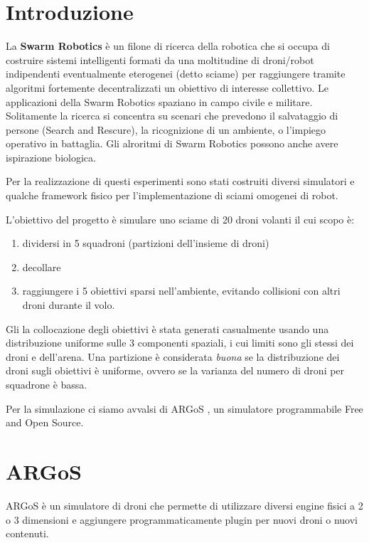 \documentclass[a4paper,11pt,oneside, table]{article}
\begin{document}
    \printindex
    \tableofcontents
    \renewcommand{\baselinestretch}{1.5}

\section{Introduzione}

La \textbf{Swarm Robotics} \`e un filone di ricerca della robotica che si occupa di costruire sistemi intelligenti formati da una moltitudine di droni/robot indipendenti eventualmente eterogenei (detto sciame) per raggiungere tramite algoritmi fortemente decentralizzati un obiettivo di interesse collettivo.
Le applicazioni della Swarm Robotics spaziano in campo civile e militare.
Solitamente la ricerca si concentra su scenari che prevedono il salvataggio di persone (Search and Rescure), la ricognizione di un ambiente, o l'impiego operativo in battaglia.
Gli alroritmi di Swarm Robotics possono anche avere ispirazione biologica\cite{mclurkin2005dynamic}.

Per la realizzazione di questi esperimenti sono stati costruiti diversi simulatori e qualche framework fisico per l'implementazione di sciami omogenei di robot.

L'obiettivo del progetto \`e simulare uno sciame di 20 droni volanti il cui scopo \`e:
\begin{enumerate}
  \item dividersi in 5 squadroni (partizioni dell'insieme di droni)
  \item decollare
  \item raggiungere i 5 obiettivi sparsi nell'ambiente, evitando collisioni con altri droni durante il volo.
\end{enumerate}

Gli la collocazione degli obiettivi è stata generati casualmente usando una distribuzione uniforme sulle 3 componenti spaziali, i cui limiti sono gli stessi dei droni e dell'arena.
Una partizione \`e considerata \textit{buona} se la distribuzione dei droni sugli obiettivi \`e uniforme, ovvero se la varianza del numero di droni per squadrone \`e bassa.

Per la simulazione ci siamo avvalsi di ARGoS \cite{Pinciroli:SI2012}, un simulatore programmabile Free and Open Source.

\section{ARGoS}

ARGoS \`e un simulatore di droni che permette di utilizzare diversi engine fisici a 2 o 3 dimensioni e aggiungere programmaticamente plugin per nuovi droni o nuovi contenuti.
\end{document}
